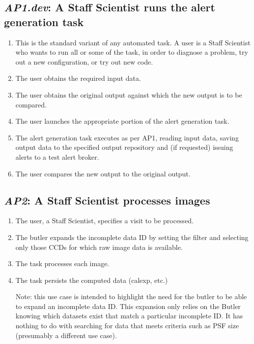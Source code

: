 \documentclass[DM,toc,lsstdraft]{lsstdoc}
\newcommand{\usecase}[3]{%
\subsection{\emph{#1}: #2}
\label{use:#1}
\begin{enumerate}[label=\alph*.]
#3
\end{enumerate}
}
\begin{document}
\usecase{AP1.dev}{A Staff Scientist runs the alert generation task}{%

\item
This is the standard variant of any automated task.
A user is a Staff Scientist who wants to run all or some of the task, in order to diagnose a problem, try out a new configuration, or try out new code.

\item
The user obtains the required input data.

\item
The user obtains the original output against which the new output is to be compared.

\item
The user launches the appropriate portion of the alert generation task.

\item
The alert generation task executes as per AP1, reading input data, saving output data to the specified output repository and (if requested) issuing alerts to a test alert broker.

\item
The user compares the new output to the original output.

}

\usecase{AP2}{A Staff Scientist processes images}{%

\item
The user, a Staff Scientist, specifies a visit to be processed.

\item
The butler expands the incomplete data ID by setting the filter and selecting only those CCDs for which raw image data is available.

\item
The task processes each image.

\item
The task persists the computed data (calexp, etc.)

Note: this use case is intended to highlight the need for the butler to be able to expand an incomplete data ID.
This expansion only relies on the Butler knowing which datasets exist that match a particular incomplete ID.
It has nothing to do with searching for data that meets criteria such as PSF size (presumably a different use case).

}
\end{document}
